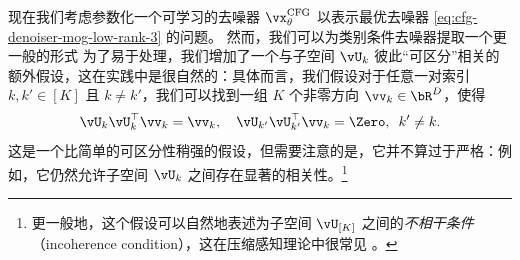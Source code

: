 \documentclass[../../book-main_zh.tex]{subfiles}
\begin{document}
\begin{example}
    现在我们考虑参数化一个可学习的去噪器 $\vx_{\theta}^{\mathrm{CFG}}$ 以表示最优去噪器 \eqref{eq:cfg-denoiser-mog-low-rank-3} 的问题。
然而，我们可以为类别条件去噪器提取一个更一般的形式
    为了易于处理，我们增加了一个与子空间 $\vU_k$ 彼此“可区分”相关的额外假设，这在实践中是很自然的：具体而言，我们假设对于任意一对索引 $k, k' \in
    [K]$ 且 $k \neq k'$，我们可以找到一组 $K$ 个非零方向 $\vv_{k} \in \bR^D$，使得
    \begin{equation}
        \vU_{k}\vU_{k}^\top \vv_k = \vv_k, \quad
        \vU_{k'}\vU_{k'}^\top \vv_k = \Zero, \enspace k' \neq k.
    \end{equation}
    这是一个比简单的可区分性稍强的假设，但需要注意的是，它并不算过于严格：例如，它仍然允许子空间 $\vU_{k}$ 之间存在显著的相关性。\footnote{更一般地，这个假设可以自然地表述为子空间 $\vU_{[K]}$ 之间的\textit{不相干条件}（incoherence condition），这在压缩感知理论中很常见 \cite{Wright-Ma-2022}。}


\end{example}
\end{document}
